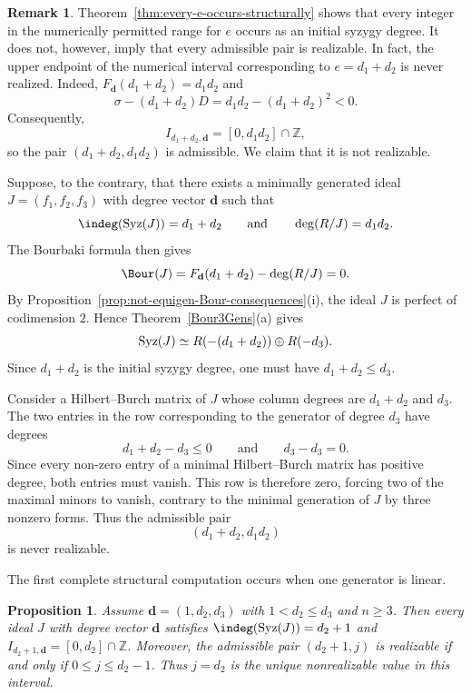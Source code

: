 \documentclass[11pt]{amsart} %
\newtheorem{Proposition}[Theorem]{Proposition}
\theoremstyle{definition}
\newtheorem{Remark}[Theorem]{Remark}
\def\syz{\mbox{\rm Syz}}
\begin{document}
\begin{Remark}\label{rem:universal-structural-gap}
Theorem~\ref{thm:every-e-occurs-structurally} shows that every integer in the
numerically permitted range for $e$ occurs as an initial syzygy degree. It
does not, however, imply that every admissible pair is realizable. In fact,
the upper endpoint of the numerical interval corresponding to
$e=d_1+d_2$ is never realized. Indeed, $F_{\mathbf d}(d_1+d_2)=d_1d_2$
and
\[
\sigma-(d_1+d_2)D=d_1d_2-(d_1+d_2)^2<0.
\]
Consequently,
\[
I_{d_1+d_2,\mathbf d}=[0,d_1d_2]\cap\mathbb Z,
\]
so the pair $(d_1+d_2,d_1d_2)$ is admissible. We claim that it is not
realizable.

Suppose, to the contrary, that there exists a minimally generated ideal
$J=(f_1,f_2,f_3)$ with degree vector $\mathbf d$ such that
\[
\indeg(\syz(J))=d_1+d_2
\qquad\text{and}\qquad
\deg(R/J)=d_1d_2.
\]
The Bourbaki formula then gives
\[
\Bour(J)
=F_{\mathbf d}(d_1+d_2)-\deg(R/J)
=0.
\]
By Proposition~\ref{prop:not-equigen-Bour-consequences}{\rm(i)}, the ideal
$J$ is perfect of codimension $2$. Hence
Theorem~\ref{Bour3Gens}{\rm(a)} gives
\[
\syz(J)\simeq
R(-(d_1+d_2))\oplus R(-d_3).
\]
Since $d_1+d_2$ is the initial syzygy degree, one must have
$d_1+d_2\le d_3$.

Consider a Hilbert--Burch matrix of $J$ whose column degrees are
$d_1+d_2$ and $d_3$. The two entries in the row corresponding to the
generator of degree $d_3$ have degrees
\[
d_1+d_2-d_3\le0
\qquad\text{and}\qquad
d_3-d_3=0.
\]
Since every non-zero entry of a minimal Hilbert--Burch matrix has positive degree,
both entries must vanish. This row is therefore zero, forcing two of the
maximal minors to vanish, contrary to the minimal generation of $J$ by
three nonzero forms. Thus the admissible pair
\[
(d_1+d_2,d_1d_2)
\]
is never realizable.
\end{Remark}


The first complete structural computation occurs when one generator is linear.
\begin{Proposition}\label{prop:linear-generator-structural-spectrum}
Assume $\mathbf d=(1,d_2,d_3)$ with $1<d_2\le d_3$ and $n\ge3$. Then every
ideal $J$ with degree vector $\mathbf d$ satisfies $\indeg(\syz(J))=d_2+1$ and
$I_{d_2+1,\mathbf d}=[0,d_2]\cap\mathbb Z$. Moreover, the admissible pair $(d_2+1,j)$ is realizable if and only if $0\le j\le d_2-1$. Thus $j=d_2$ is the unique nonrealizable value in this interval.
\end{Proposition}
\end{document}
